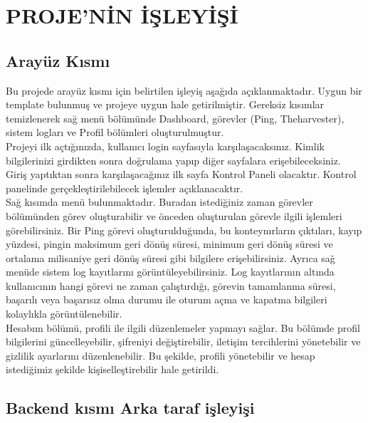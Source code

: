 \section{PROJE'NİN İŞLEYİŞİ}
\subsection{Arayüz Kısmı }
Bu projede arayüz kısmı için belirtilen işleyiş aşağıda açıklanmaktadır. Uygun bir template bulunmuş ve projeye uygun hale getirilmiştir. Gereksiz kısımlar temizlenerek sağ menü bölümünde Dashboard, görevler (Ping, Theharvester), sistem logları ve Profil bölümleri oluşturulmuştur.\\
Projeyi ilk açtığınızda, kullanıcı login sayfasıyla karşılaşacaksınız. Kimlik bilgilerinizi girdikten sonra doğrulama yapıp diğer sayfalara erişebileceksiniz. Giriş yaptıktan sonra karşılaşacağınız ilk sayfa Kontrol Paneli olacaktır. Kontrol panelinde gerçekleştirilebilecek işlemler açıklanacaktır.\\
Sağ kısımda menü bulunmaktadır. Buradan istediğiniz zaman görevler bölümünden görev oluşturabilir ve önceden oluşturulan görevle ilgili işlemleri görebilirsiniz. Bir Ping görevi oluşturulduğunda, bu konteynırların çıktıları, kayıp yüzdesi, pingin maksimum geri dönüş süresi, minimum geri dönüş süresi ve ortalama milisaniye geri dönüş süresi gibi bilgilere erişebilirsiniz. Ayrıca sağ menüde sistem log kayıtlarını görüntüleyebilirsiniz. Log kayıtlarının altında kullanıcının hangi görevi ne zaman çalıştırdığı, görevin tamamlanma süresi, başarılı veya başarısız olma durumu ile oturum açma ve kapatma bilgileri kolaylıkla görüntülenebilir.\\
Hesabım bölümü, profili ile ilgili düzenlemeler yapmayı sağlar. Bu bölümde profil bilgilerini güncelleyebilir, şifreniyi değiştirebilir, iletişim tercihlerini yönetebilir ve gizlilik ayarlarını düzenlenebilir. Bu şekilde, profili yönetebilir ve hesap istediğimiz  şekilde kişiselleştirebilir hale getirildi.
\subsection{Backend kısmı Arka taraf işleyişi}


